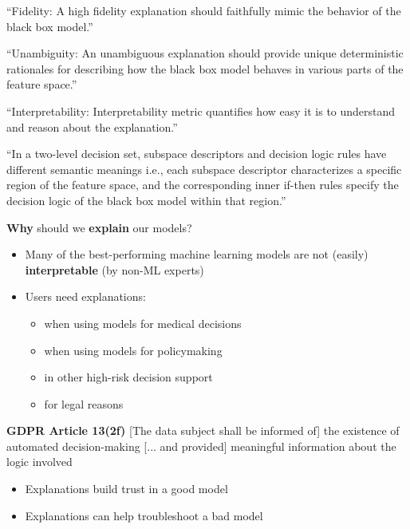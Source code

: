 \documentclass[aspectratio=169]{beamer}
\begin{document}
	\begin{frame}
		``Fidelity: A high fidelity explanation should faithfully mimic the
		behavior of the black box model.''
		
		``Unambiguity: An unambiguous explanation should provide
		unique deterministic rationales for describing how the black box
		model behaves in various parts of the feature space.''
		
		``Interpretability: Interpretability metric quantifies how easy it
		is to understand and reason about the explanation.''
	\end{frame}

	\begin{frame}
		``In a two-level decision set, subspace descriptors and decision
		logic rules have different semantic meanings i.e., each subspace
		descriptor characterizes a specific region of the feature space, and
		the corresponding inner if-then rules specify the decision logic of
		the black box model within that region.''
	\end{frame}


%

\begin{frame}{\textbf{Why} should we \textbf{explain} our models?}

\begin{itemize}[<+->]
	\item Many of the best-performing machine learning models are not (easily) \textbf{interpretable} (by non-ML experts)
	\item Users need explanations:
	\begin{itemize}
		\item when using models for medical decisions
		\item when using models for policymaking
		\item in other high-risk decision support
		\item for legal reasons
	\end{itemize}
\end{itemize}
\pause

\textbf{GDPR Article 13(2f)} [The data subject shall be informed of] the existence of automated decision-making [... and provided] meaningful information about the logic involved

\begin{itemize}[<+->]
	\item Explanations build trust in a good model
	\item Explanations can help troubleshoot a bad model
\end{itemize}
\end{frame}
\end{document}
